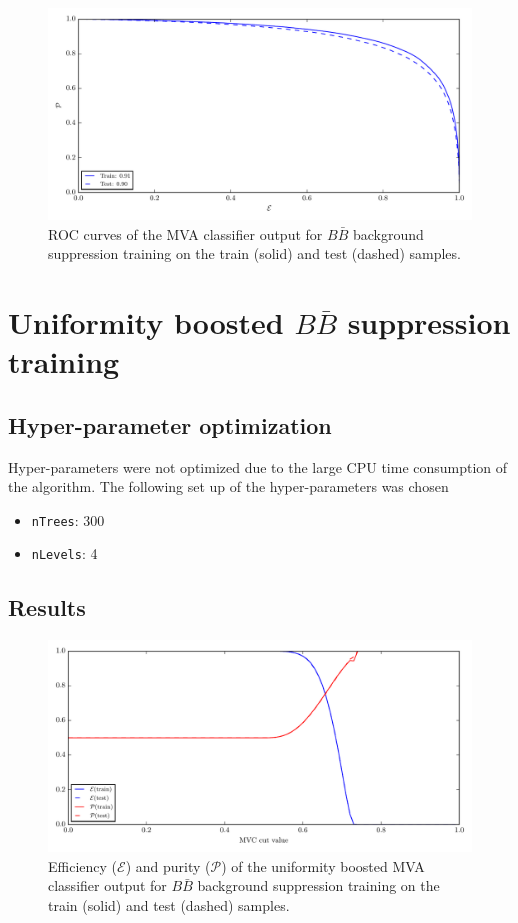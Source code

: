 \begin{figure}[H]
\centering
\captionsetup{width=0.8\linewidth}
\includegraphics[width=\linewidth]{fig/addendums/BB01c_roc}
\caption{ROC curves of the MVA classifier output for $B\bar B$ background suppression training on the train (solid) and test (dashed) samples.}
\end{figure}

\section*{Uniformity boosted $B \bar B$ suppression training}

\subsection*{Hyper-parameter optimization}

Hyper-parameters were not optimized due to the large CPU time consumption of the algorithm. The following set up of the hyper-parameters was chosen
\begin{itemize}
\item \texttt{nTrees}: 300
\item \texttt{nLevels}: 4
\end{itemize}

\subsection*{Results}

\begin{figure}[H]
\centering
\captionsetup{width=0.8\linewidth}
\includegraphics[width=\linewidth]{fig/addendums/uMVA1dc_effpur}
\caption{Efficiency ($\mathcal{E}$) and purity ($\mathcal{P}$) of the uniformity boosted MVA classifier output for $B\bar B$ background suppression training on the train (solid) and test (dashed) samples.}
\end{figure}

